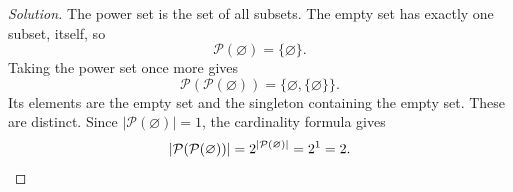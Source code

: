 
\begin{proof}[Solution]
The power set is the set of all subsets. The empty set has exactly
one subset, itself, so
\[
  \mathcal{P}(\varnothing)=\{\varnothing\}.
\]
Taking the power set once more gives
\[
  \mathcal{P}(\mathcal{P}(\varnothing))
    =\{\varnothing,\{\varnothing\}\}.
\]
Its elements are the empty set and the singleton containing the empty
set. These are distinct. Since $|\mathcal{P}(\varnothing)|=1$, the
cardinality formula gives
\[
  |\mathcal{P}(\mathcal{P}(\varnothing))|
    =2^{|\mathcal{P}(\varnothing)|}=2^1=2.\qedhere
\]
\end{proof}
